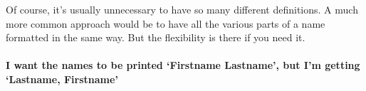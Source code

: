 Of course, it's usually unnecessary to have so many different definitions. A much more common approach would be to have all the various parts of a name formatted in the same way. But the flexibility is there if you need it.

\paragraph{I want the names to be printed `Firstname Lastname', but I'm getting `Lastname, Firstname'}